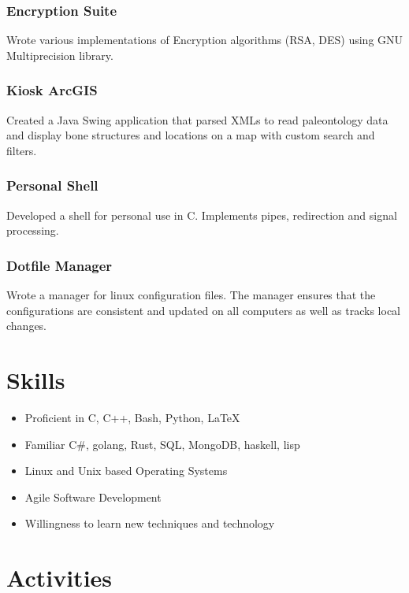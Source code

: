 \documentclass[11pt]{article}
\begin{document}
\subsubsection{Encryption Suite}
Wrote various implementations of Encryption algorithms (RSA, DES) using GNU Multiprecision library.

\subsubsection{Kiosk ArcGIS}
 Created a Java Swing application that parsed XMLs to read paleontology data and display bone structures and 
 locations on a map with custom search and filters.

\subsubsection{Personal Shell}
Developed a shell for personal use in C. Implements pipes, redirection and signal processing.

\subsubsection{Dotfile Manager}
Wrote a manager for linux configuration files.
The manager ensures that the configurations are consistent and updated on all computers as well as tracks local changes.

\section{S{\color{gray}kills}}

\begin{multicols}{2}
	\begin{itemize}
	\item Proficient in C, C++, Bash, Python, \LaTeX
	\item Familiar C\#, golang, Rust, SQL, MongoDB, haskell, lisp
	\item Linux and Unix based Operating Systems
	\item Agile Software Development
	\item Willingness to learn new techniques and technology
\end{itemize}
\end{multicols}

\section{A{\color{gray}ctivities}}
\end{document}
